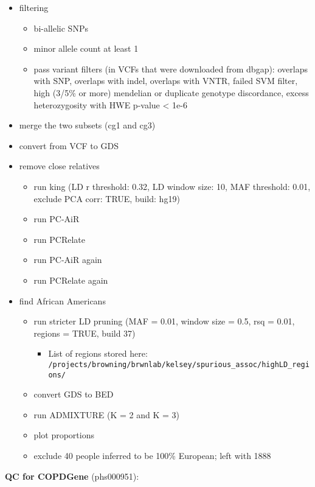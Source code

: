 \documentclass[12pt]{article}
\begin{document}
\begin{itemize}
\item filtering
	\begin{itemize}
	\item bi-allelic SNPs
	\item minor allele count at least 1
	\item pass variant filters (in VCFs that were downloaded from dbgap): overlaps with SNP, overlaps with indel, overlaps with VNTR, failed SVM filter, high (3/5\% or more) mendelian or duplicate genotype discordance, excess heterozygosity with HWE p-value < 1e-6
	\end{itemize}
\item merge the two subsets (cg1 and cg3)
\item convert from VCF to GDS
\item remove close relatives
	\begin{itemize}
	\item run king (LD r threshold: 0.32, LD window size: 10, MAF threshold: 0.01, exclude PCA corr: TRUE, build: hg19)
	\item run PC-AiR 
	\item run PCRelate 
	\item run PC-AiR again
	\item run PCRelate again
	\end{itemize}
\item find African Americans
	\begin{itemize}
	\item run stricter LD pruning (MAF  = 0.01, window size = 0.5, rsq = 0.01, regions = TRUE, build 37)
		\begin{itemize}
		\item List of regions stored here: \verb"/projects/browning/brwnlab/kelsey/spurious_assoc/highLD_regions/"
		\end{itemize}
	\item convert GDS to BED
	\item run ADMIXTURE (K = 2 and K = 3)
	\item plot proportions
	\item exclude 40 people inferred to be 100\% European; left with 1888
	\end{itemize}
\end{itemize}

\textbf{QC for COPDGene} (phs000951):
\end{document}

